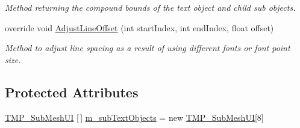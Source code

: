 \begin{DoxyCompactItemize}
\begin{DoxyCompactList}\small\item\em Method returning the compound bounds of the text object and child sub objects. \end{DoxyCompactList}\item 
override void \mbox{\hyperlink{class_t_m_pro_1_1_text_mesh_pro_u_g_u_i_a1dbe4fb436b075d435051a851b365e05}{Adjust\+Line\+Offset}} (int start\+Index, int end\+Index, float offset)
\begin{DoxyCompactList}\small\item\em Method to adjust line spacing as a result of using different fonts or font point size. \end{DoxyCompactList}\end{DoxyCompactItemize}
\subsection*{Protected Attributes}
\begin{DoxyCompactItemize}
\item 
\mbox{\hyperlink{class_t_m_pro_1_1_t_m_p___sub_mesh_u_i}{T\+M\+P\+\_\+\+Sub\+Mesh\+UI}} \mbox{[}$\,$\mbox{]} \mbox{\hyperlink{class_t_m_pro_1_1_text_mesh_pro_u_g_u_i_a9dbdd3c243c1c77725a9d97ef99ee457}{m\+\_\+sub\+Text\+Objects}} = new \mbox{\hyperlink{class_t_m_pro_1_1_t_m_p___sub_mesh_u_i}{T\+M\+P\+\_\+\+Sub\+Mesh\+UI}}\mbox{[}8\mbox{]}
\end{DoxyCompactItemize}
